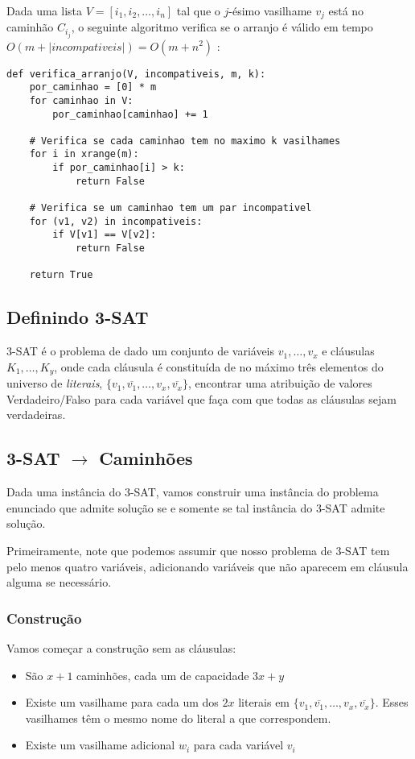 \documentclass[11pt]{article}
\begin{document}
Dada uma lista $V = [i_1, i_2, \ldots , i_n]$ tal que o
$j$-ésimo vasilhame $v_j$ está no caminhão $C_{i_j}$, o
seguinte algoritmo verifica se o arranjo é válido em tempo
$O(m + |\textit{incompativeis}|) = O(m + n^2)$ :
\begin{verbatim}
def verifica_arranjo(V, incompativeis, m, k):
    por_caminhao = [0] * m
    for caminhao in V:
        por_caminhao[caminhao] += 1

    # Verifica se cada caminhao tem no maximo k vasilhames
    for i in xrange(m):
        if por_caminhao[i] > k:
            return False

    # Verifica se um caminhao tem um par incompativel
    for (v1, v2) in incompativeis:
        if V[v1] == V[v2]:
            return False

    return True
\end{verbatim}

\subsection{Definindo 3-SAT}
\label{sec-3-2}

3-SAT é o problema de dado um conjunto de variáveis $v_1, \ldots, v_x$
e cláusulas $K_1, \ldots, K_y$, onde cada cláusula é constituída de no
máximo três elementos do universo de \textit{literais}, $\{v_1,
\overline{v_1}, \ldots, v_x, \overline{v_x}\}$, encontrar uma
atribuição de valores Verdadeiro/Falso para cada variável
que faça com que todas as cláusulas sejam verdadeiras.

\subsection{3-SAT $\to$ Caminhões}
\label{sec-3-3}

Dada uma instância do 3-SAT, vamos construir uma instância do problema
enunciado que admite solução se e somente se tal
instância do 3-SAT admite solução.

Primeiramente, note que podemos assumir que nosso
problema de 3-SAT tem pelo menos quatro variáveis, adicionando
variáveis que não aparecem em cláusula alguma se necessário.

\subsubsection{Construção}
\label{sec-3-3-1}

Vamos começar a construção sem as cláusulas:

\begin{itemize}
\item São $x+1$ caminhões, cada um de capacidade $3x+y$

\item Existe um vasilhame para cada um dos $2x$ literais em $\{v_1,
  \overline{v_1}, \ldots, v_x, \overline{v_x}\}$. Esses vasilhames têm o
mesmo nome do literal a que correspondem.

\item Existe um vasilhame adicional $w_i$ para cada variável $v_i$
\end{itemize}
\end{document}

